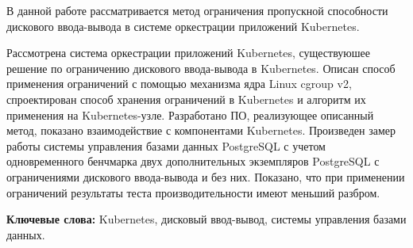 \begin{essay}{}

В данной работе рассматривается метод ограничения пропускной способности дискового ввода-вывода в системе оркестрации приложений Kubernetes.

Рассмотрена система оркестрации приложений Kubernetes, существуюшее решение по ограничению дискового ввода-вывода в Kubernetes. Описан способ применения ограничений с помощью механизма ядра Linux cgroup v2, спроектирован способ хранения ограничений в Kubernetes и алгоритм их применения на Kubernetes-узле. Разработано ПО, реализующее описанный метод, показано взаимодействие с компонентами Kubernetes. Произведен замер работы системы управления базами данных PostgreSQL с учетом одновременного бенчмарка двух дополнительных экземпляров PostgreSQL с ограничениями дискового ввода-вывода и без них. Показано, что при применении ограничений результаты теста производительности имеют меньший разбром.

\textbf{Ключевые слова:} Kubernetes, дисковый ввод-вывод, системы управления базами данных.

\end{essay}